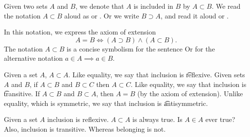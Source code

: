 Given two sets $A$ and $B$, we denote that $A$ is included in $B$ by $A \subset B$.
We read the notation $A \subset B$ aloud as  or .
Or we write $B \supset A$, and read it aloud  or .

In this notation, we express the axiom of extension
\[
  A = B \Leftrightarrow (A \supset B) \land (A \subset B).
\]
The notation $A \subset B$
is a concise symbolism for
the sentence
 Or for the alternative notation
$a \in A \implies a \in B$.


Given a set $A$, $A \subset A$.
Like equality, we say that inclusion is \t{reflexive}.
Given sets $A$ and $B$, if $A \subset B$ and $B \subset C$ then $A \subset C$.
Like equality, we say that inclusion is \t{transitive}.
If $A \subset B$ and $B \subset A$, then $A = B$ (by the axiom of extension).
Unlike equality, which is symmetric, we say that inclusion is \t{antisymmetric}.


Given a set $A$ inclusion is reflexive.
$A \subset A$ is always true.
Is $A \in A$ ever true?
Also, inclusion is transitive.
Whereas belonging is not.

\blankpage

